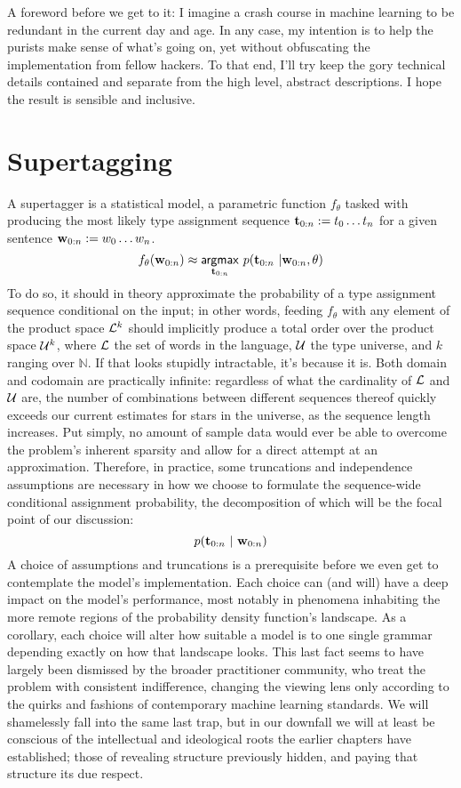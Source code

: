A foreword before we get to it: I imagine a crash course in machine learning to be redundant in the current day and age.
In any case, my intention is to help the purists make sense of what's going on, yet without obfuscating the implementation from fellow hackers.
To that end, I'll try keep the gory technical details contained and separate from the high level, abstract descriptions.
I hope the result is sensible and inclusive.


\section{Supertagging}
A supertagger is a statistical model, a parametric function $f_\theta$ tasked with producing the most likely type assignment sequence $\mathbf{t}_{0:n} := t_0 \dots t_n$ for a given sentence $\mathbf{w}_{0:n} := w_0 \dots w_n$.
\begin{equation}
	f_\theta(\mathbf{w}_{0:n}) \approx \underset{\mathbf{t}_{0:n}}{\mathsf{argmax}} ~ p(\mathbf{t}_{0:n} \ | \mathbf{w}_{0:n}, \theta)
\end{equation}
To do so, it should in theory approximate the probability of a type assignment sequence conditional on the input; in other words, feeding $f_\theta$ with any element of the product space $\mathcal{L}^k$ should implicitly produce a total order over the product space $\mathcal{U}^{k}$, where $\mathcal{L}$ the set of words in the language, $\mathcal{U}$ the type universe, and $k$ ranging over $\mathbb{N}$.
If that looks stupidly intractable, it's because it is.
Both domain and codomain are practically infinite: regardless of what the cardinality of $\mathcal{L}$ and $\mathcal{U}$ are, the number of combinations between different sequences thereof quickly exceeds our current estimates for stars in the universe, as the sequence length increases.
Put simply, no amount of sample data would ever be able to overcome the problem's inherent sparsity and allow for a direct attempt at an approximation.
Therefore, in practice, some truncations and independence assumptions are necessary in how we choose to formulate the sequence-wide conditional assignment probability, the decomposition of which will be the focal point of our discussion:
\begin{equation}\label{equation:supertag}
p(\mathbf{t}_{0:n} \ | \ \mathbf{w}_{0:n})
\end{equation}
A choice of assumptions and truncations is a prerequisite before we even get to contemplate the model's implementation.
Each choice can (and will) have a deep impact on the model's performance, most notably in phenomena inhabiting the more remote regions of the probability density function's landscape.
As a corollary, each choice will alter how suitable a model is to one single grammar depending exactly on how that landscape looks.
This last fact seems to have largely been dismissed by the broader practitioner community, who treat the problem with consistent indifference, changing the viewing lens only according to the quirks and fashions of contemporary machine learning standards.
We will shamelessly fall into the same last trap, but in our downfall we will at least be conscious of the intellectual and ideological roots the earlier chapters have established; those of revealing structure previously hidden, and paying that structure its due respect.

